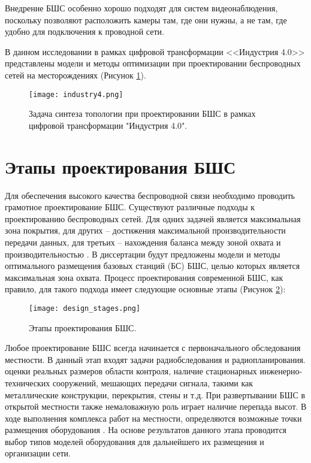 Внедрение БШС особенно хорошо подходят для систем видеонаблюдения, поскольку позволяют расположить камеры там, где они нужны, а не там, где удобно для подключения к проводной сети.

В данном исследовании в рамках цифровой трансформации <<Индустрия 4.0>> представлены модели и методы оптимизации при проектировании беспроводных сетей на месторождениях  (Рисунок \cref{fig:industry4}).

\begin{figure}[h!]
  \centering
   \texttt{[image: industry4.png]}
\caption{Задача синтеза топологии при проектировании БШС в рамках цифровой трансформации "Индустрия 4.0".}
\label{fig:industry4}
\end{figure}



\section{Этапы проектирования БШС}

Для обеспечения высокого качества беспроводной связи необходимо проводить грамотное проектирование БШС. Существуют различные подходы к проектированию беспроводных сетей. Для одних задачей является максимальная зона покрытия, для других -- достижения максимальной производительности передачи данных, для третьих -- нахождения баланса между зоной охвата и производительностью \cite{Proletarsky}. В диссертации будут предложены модели и методы оптимального размещения базовых станций (БС) БШС, целью которых является максимальная зона охвата.  Процесс проектирования современной БШС, как правило, для такого подхода имеет следующие основные этапы (Рисунок \cref{fig:part1_design_stages}):

\begin{figure}[h!]
  \centering
   \texttt{[image: design\_stages.png]}
\caption{Этапы проектирования БШС.}
\label{fig:part1_design_stages}
\end{figure}

Любое проектирование БШС всегда начинается с первоначального обследования местности. В данный этап входят задачи радиобследования и радиопланирования. оценки реальных размеров области контроля, наличие стационарных инженерно-технических сооружений, мешающих передачи сигнала, такими как металлические конструкции, перекрытия, стены и т.д. При развертывании БШС в открытой местности также немаловажную роль играет наличие перепада высот. В ходе выполнения комплекса работ на местности, определяются возможные точки размещения оборудования \cite{Dunaitsev2017}. На основе результатов данного этапа проводится выбор типов моделей оборудования для дальнейшего их размещения и организации сети.

